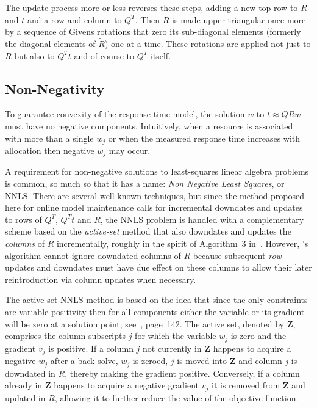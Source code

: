 The update process more or less reverses these steps, adding a new top row to $R$ and $t$ and a row and column to $Q^T$.
Then $R$ is made upper triangular once more by a sequence of Givens rotations that zero its sub-diagonal elements
(formerly the diagonal elements of $\tilde{R}$) one at a time.
These rotations are applied not just to $R$ but also to $Q^Tt$ and of course to $Q^T$ itself.

\subsection*{Non-Negativity}

To guarantee convexity of the response time model, the solution $w$ to $t \approx QRw$ must have no negative components.
Intuitively, when a resource is associated with more than a single $w_j$
or when the measured response time increases with allocation then negative $w_j$ may occur.

A requirement for non-negative solutions to least-squares linear algebra problems is common,
so much so that it has a name: \emph{Non Negative Least Squares}, or NNLS.
There are several well-known techniques\cite{ChPl},
but since the method proposed here for online model maintenance calls for
incremental downdates and updates to rows of $Q^T$, $Q^Tt$ and $R$,
the NNLS problem is handled with a complementary scheme
based on the \emph{active-set} method\cite{LaHa} that
also downdates and updates the \emph{columns} of $R$ incrementally,
roughly in the spirit of Algorithm~3 in~\cite{LuDu}.
However, \pacora's algorithm cannot ignore downdated columns of $R$
because subsequent \emph{row} updates and downdates must have due effect
on these columns to allow their later reintroduction via column updates when necessary.

The active-set NNLS method is based on the idea that since the only constraints are variable positivity
then for all components either the variable or its gradient will be zero at a solution point; see~\cite{BoVa}, page~142.
The active set, denoted by \textbf{Z}, comprises the column subscripts $j$ for which the variable $w_j$ is zero and the gradient $v_j$ is positive.
If a column $j$ not currently in \textbf{Z} happens to acquire a negative $w_j$ after a back-solve, $w_j$ is zeroed,
$j$ is moved into \textbf{Z} and column $j$ is downdated in $R$, thereby making the gradient positive.
Conversely, if a column already in \textbf{Z} happens to acquire a negative gradient $v_j$ it is removed from \textbf{Z} and updated in $R$,
allowing it to further reduce the value of the objective function.

